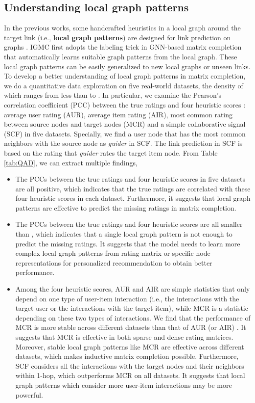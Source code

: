 \documentclass[sigconf]{acmart}
\begin{document}
\subsection{Understanding local graph patterns}
\label{sub_sec_1}
In the previous works, some handcrafted heuristics in a local graph around the target link (i.e., \textbf{local graph patterns}) are designed for link prediction on graphs \cite{liben2007link}. IGMC first adopts the labeling trick in GNN-based matrix completion that automatically learns suitable graph patterns from the local graph. 
These local graph patterns can be easily generalized to new local graphs or unseen links. 
To develop a better understanding of local graph patterns in matrix completion, we do a quantitative data exploration on five real-world datasets, the density of which ranges from less than  to . In particular, we examine the Pearson's correlation coefficient (PCC) between the true ratings and four heuristic scores \cite{liben2007link, zeng2021graph}: average user rating (AUR), average item rating (AIR), most common rating between source nodes and target nodes (MCR) and a simple collaborative signal (SCF) in five datasets. Specially, we find a user node that has the most common neighbors with the source node as \emph{guider} in SCF. The link prediction in SCF is based on the rating that \emph{guider} rates the target item node. From Table \ref{tab:QAD}, we can extract multiple findings,
\begin{itemize}[leftmargin=*]
    \item The PCCs between the true ratings and four heuristic scores in five datasets are all positive, which indicates that the true ratings are correlated with these four heuristic scores in each dataset. Furthermore, it suggests that local graph patterns are effective to predict the missing ratings in matrix completion.
    \item The PCCs between the true ratings and four heuristic scores are all smaller than , which indicates that a single local graph pattern is not enough to predict the missing ratings. It suggests that the model needs to learn more complex local graph patterns from rating matrix or specific node representations for personalized recommendation to obtain better performance.
    \item Among the four heuristic scores, AUR and AIR are simple statistics that only depend on one type of user-item interaction (i.e., the interactions with the target user or the interactions with the target item), while MCR is a statistic depending on these two types of interactions. We find that the performance of MCR is more stable across different datasets than that of AUR (or AIR) . It suggests that MCR is effective in both sparse and dense rating matrices. Moreover, stable local graph patterns like MCR are effective across different datasets, which makes inductive matrix completion possible. Furthermore, SCF considers all the interactions with the target nodes and their neighbors within 1-hop, which outperforms MCR on all datasets. It suggests that local graph patterns which consider more user-item interactions may be more powerful.  
\end{itemize}
\end{document}
